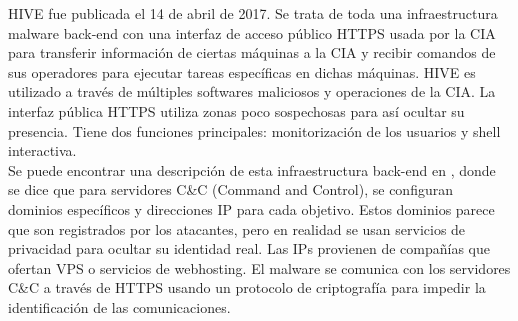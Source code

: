 HIVE \cite{hive} fue publicada el 14 de abril de 2017. Se trata de toda una infraestructura malware back-end con una interfaz de acceso público HTTPS usada por la CIA para transferir información de ciertas máquinas a la CIA y recibir comandos de sus operadores para ejecutar tareas específicas en dichas máquinas. HIVE es utilizado a través de múltiples softwares maliciosos y operaciones de la CIA. La interfaz pública HTTPS utiliza zonas poco sospechosas para así ocultar su presencia. Tiene dos funciones principales: monitorización de los usuarios y shell interactiva. \\

Se puede encontrar una descripción de esta infraestructura back-end en \cite{symantec}, donde se dice que para servidores C\&C (Command and Control), se configuran dominios específicos y direcciones IP para cada objetivo. Estos dominios parece que son registrados por los atacantes, pero en realidad se usan servicios de privacidad para ocultar su identidad real. Las IPs provienen de compañías que ofertan VPS o servicios de webhosting. El malware se comunica con los servidores C\&C a través de HTTPS usando un protocolo de criptografía para impedir la identificación de las comunicaciones. 

